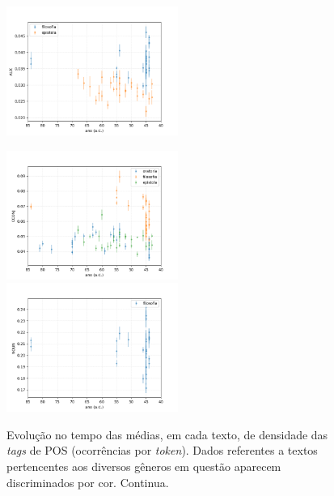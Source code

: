 \documentclass[10pt,a4paper,onecolumn]{article}
\theoremstyle{definition}
\theoremstyle{remark}
\begin{document}
\begin{figure}[htpb!]
\begin{multicols}{2}
		\includegraphics[width=0.5\textwidth]{graficos/AUX_no_tempo.png}  \\
	\end{multicols}\vspace{-0.75cm}
	\begin{multicols}{2}
		\includegraphics[width=0.5\textwidth]{graficos/CCONJ_no_tempo.png}  \\
		\includegraphics[width=0.5\textwidth]{graficos/NOUN_no_tempo.png}  \\
	\end{multicols}
	\caption{Evolução no tempo das médias, em cada texto, de densidade das \emph{tags} de POS (ocorrências por \emph{token}). Dados referentes a textos pertencentes aos diversos gêneros em questão aparecem discriminados por cor. Continua.}
	\label{fig:serie1}
\end{figure}
\end{document}
